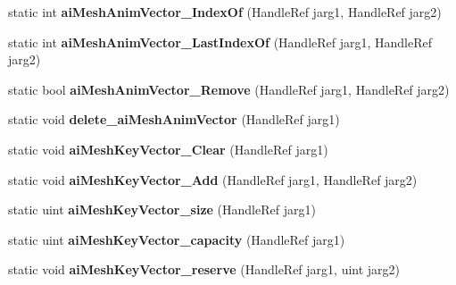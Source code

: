 \begin{DoxyCompactItemize}
\item 
\hypertarget{class_assimp_p_i_n_v_o_k_e_ad612bb95b245d787a621b03cd63ced1b}{static int {\bfseries ai\+Mesh\+Anim\+Vector\+\_\+\+Index\+Of} (Handle\+Ref jarg1, Handle\+Ref jarg2)}\label{class_assimp_p_i_n_v_o_k_e_ad612bb95b245d787a621b03cd63ced1b}

\item 
\hypertarget{class_assimp_p_i_n_v_o_k_e_ad7fd91f6ad13a27a6facb2a47d2a83c2}{static int {\bfseries ai\+Mesh\+Anim\+Vector\+\_\+\+Last\+Index\+Of} (Handle\+Ref jarg1, Handle\+Ref jarg2)}\label{class_assimp_p_i_n_v_o_k_e_ad7fd91f6ad13a27a6facb2a47d2a83c2}

\item 
\hypertarget{class_assimp_p_i_n_v_o_k_e_a226cb9f911ba95dd2253dd46d740587d}{static bool {\bfseries ai\+Mesh\+Anim\+Vector\+\_\+\+Remove} (Handle\+Ref jarg1, Handle\+Ref jarg2)}\label{class_assimp_p_i_n_v_o_k_e_a226cb9f911ba95dd2253dd46d740587d}

\item 
\hypertarget{class_assimp_p_i_n_v_o_k_e_a53ea41761694d5b3ef1e5d909423561c}{static void {\bfseries delete\+\_\+ai\+Mesh\+Anim\+Vector} (Handle\+Ref jarg1)}\label{class_assimp_p_i_n_v_o_k_e_a53ea41761694d5b3ef1e5d909423561c}

\item 
\hypertarget{class_assimp_p_i_n_v_o_k_e_aaa2bcabbfe153ce4644ae5c75f12fb88}{static void {\bfseries ai\+Mesh\+Key\+Vector\+\_\+\+Clear} (Handle\+Ref jarg1)}\label{class_assimp_p_i_n_v_o_k_e_aaa2bcabbfe153ce4644ae5c75f12fb88}

\item 
\hypertarget{class_assimp_p_i_n_v_o_k_e_ae5586307b5d237c5809d26464ff0de7f}{static void {\bfseries ai\+Mesh\+Key\+Vector\+\_\+\+Add} (Handle\+Ref jarg1, Handle\+Ref jarg2)}\label{class_assimp_p_i_n_v_o_k_e_ae5586307b5d237c5809d26464ff0de7f}

\item 
\hypertarget{class_assimp_p_i_n_v_o_k_e_ac689f54c1381f81c7ac173850a5b1347}{static uint {\bfseries ai\+Mesh\+Key\+Vector\+\_\+size} (Handle\+Ref jarg1)}\label{class_assimp_p_i_n_v_o_k_e_ac689f54c1381f81c7ac173850a5b1347}

\item 
\hypertarget{class_assimp_p_i_n_v_o_k_e_afc5c37b9164f75b363f428364a9df073}{static uint {\bfseries ai\+Mesh\+Key\+Vector\+\_\+capacity} (Handle\+Ref jarg1)}\label{class_assimp_p_i_n_v_o_k_e_afc5c37b9164f75b363f428364a9df073}

\item 
\hypertarget{class_assimp_p_i_n_v_o_k_e_ae7eefa09b24851a38002e7f66334e2f6}{static void {\bfseries ai\+Mesh\+Key\+Vector\+\_\+reserve} (Handle\+Ref jarg1, uint jarg2)}\label{class_assimp_p_i_n_v_o_k_e_ae7eefa09b24851a38002e7f66334e2f6}


\end{DoxyCompactItemize}

